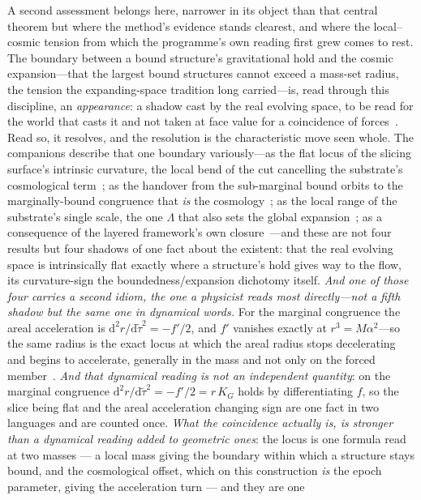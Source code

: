 \documentclass[11pt,a4paper]{article}
\newcommand{\dd}{\mathrm{d}}
\begin{document}
A second assessment belongs here, narrower in its object than that central theorem but where the method's evidence stands clearest, and where the local--cosmic tension from which the programme's own reading first grew comes to rest. The boundary between a bound structure's gravitational hold and the cosmic expansion---that the largest bound structures cannot exceed a mass-set radius, the tension the expanding-space tradition long carried---is, read through this discipline, an \emph{appearance}: a shadow cast by the real evolving space, to be read for the world that casts it and not taken at face value for a coincidence of forces~\cite{PavlidouTomaras2014}. Read so, it resolves, and the resolution is the characteristic move seen whole. The companions describe that one boundary variously---as the flat locus of the slicing surface's intrinsic curvature, the local bend of the cut cancelling the substrate's cosmological term~\cite{JanzenSlicing}; as the handover from the sub-marginal bound orbits to the marginally-bound congruence that \emph{is} the cosmology~\cite{JanzenOperator}; as the local range of the substrate's single scale, the one $\Lambda$ that also sets the global expansion~\cite{JanzenCRcosmology,JanzenGeometricCore}; as a consequence of the layered framework's own closure~\cite{JanzenCRframework}---and these are not four results but four shadows of one fact about the existent: that the real evolving space is intrinsically flat exactly where a structure's hold gives way to the flow, its curvature-sign the boundedness/expansion dichotomy itself. \emph{And one of those four carries a second idiom, the one a physicist reads most directly---not a fifth shadow but the same one in dynamical words.} For the
marginal congruence the areal acceleration is $\dd^{2}r/\dd\tilde\tau^{2}=-f'/2$, and $f'$ vanishes exactly at
$r^{3}=M\alpha^{2}$---so the same radius is the exact locus at which the areal radius stops decelerating and
begins to accelerate, generally in the mass and not only on the forced member~\cite{JanzenSlicing}. \emph{And that
dynamical reading is not an independent quantity}: on the marginal congruence
$\dd^{2}r/\dd\tilde\tau^{2}=-f'/2=r\,K_{G}$ holds by differentiating $f$, so the slice being flat and the areal
acceleration changing sign are one fact in two languages and are counted once. \emph{What the coincidence
actually is, is stronger than a dynamical reading added to geometric ones}: the locus is one formula read at two
masses --- a local mass giving the boundary within which a structure stays bound, and the cosmological offset,
which on this construction \emph{is} the epoch parameter, giving the acceleration turn --- and they are one
\end{document}
